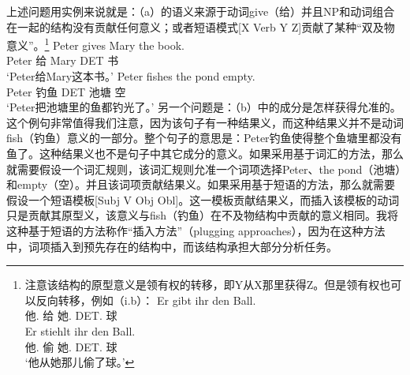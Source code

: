 上述问题用实例来说就是：（a）的语义来源于动词give（给）并且NP和动词组合在一起的结构没有贡献任何意义；或者短语模式[X Verb Y Z]贡献了某种“双及物意义”。\footnote{
注意该结构的原型意义是领有权的转移，即Y从X那里获得Z。但是领有权也可以反向转移，例如（i.b）：
\eal
\ex 
\gll Er gibt ihr den Ball.\\
     他.\nom{} 给 她.\dat{} DET.\acc{} 球\\
\ex
\gll Er stiehlt ihr den Ball.\\
     他.\nom{} 偷  她.\dat{} DET.\acc{} 球\\
\glt `他从她那儿偷了球。'
\zllast
}
\eal
\ex 
\gll Peter gives Mary the book.\\
      Peter 给 Mary DET 书\\
\glt `Peter给Mary这本书。'      
\ex 
\gll Peter fishes the pond empty.\\
Peter 钓鱼 DET 池塘 空\\
\glt `Peter把池塘里的鱼都钓光了。'   
\zl
另一个问题是：（b）中的成分是怎样获得允准的。这个例句非常值得我们注意，因为该句子有一种结果义，而这种结果义并不是动词fish（钓鱼）意义的一部分。整个句子的意思是：Peter钓鱼使得整个鱼塘里都没有鱼了。这种结果义也不是句子中其它成分的意义。如果采用基于词汇的方法，那么就需要假设一个词汇规则，该词汇规则允准一个词项选择Peter、the pond（池塘）和empty（空）。并且该词项贡献结果义。如果采用基于短语的方法，那么就需要假设一个短语模板[Subj V Obj Obl]。这一模板贡献结果义，而插入该模板的动词只是贡献其原型义，该意义与fish（钓鱼）在不及物结构中贡献的意义相同。我将这种基于短语的方法称作“插入方法”（plugging approaches），因为在这种方法中，词项插入到预先存在的结构中，而该结构承担大部分分析任务。
